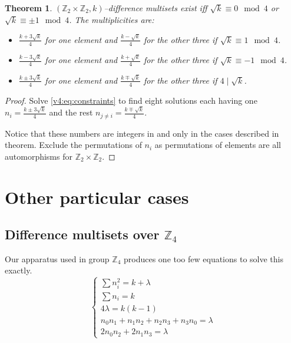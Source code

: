 \documentclass{article}
\theoremstyle{plain}
\newtheorem{theorem}{Theorem}[section]
\theoremstyle{definition}
\theoremstyle{remark}
\begin{document}
		\begin{theorem}
			\label{v4:theorem:z2z2}
			$(\mathbb Z_2 \times \mathbb Z_2, k)$--difference multisets exist iff $\sqrt k \equiv 0 \mod 4$ or $\sqrt k \equiv \pm 1 \mod 4$. The multiplicities are:
			\begin{itemize}
				\item $\frac{k + 3 \sqrt k}{4}$ for one element and $\frac{k - \sqrt k}{4}$ for the other three if $\sqrt k \equiv 1 \mod 4$.
				\item $\frac{k - 3 \sqrt k}{4}$ for one element and $\frac{k + \sqrt k}{4}$ for the other three if $\sqrt k \equiv -1 \mod 4$.
				\item $\frac{k \pm 3 \sqrt k}{4}$ for one element and $\frac{k \mp \sqrt k}{4}$ for the other three if $4 \mid \sqrt k$.
			\end{itemize}
		\end{theorem}
		
		\begin{proof}
			Solve \eqref{v4:eq:constraints} to find eight solutions each having one $n_i = \frac{k \pm 3 \sqrt k}{4}$ and the rest $n_{j \neq i} = \frac{k \mp \sqrt k}{4}$.
			
			Notice that these numbers are integers in and only in the cases described in theorem. Exclude the permutations of $n_i$ as permutations of elements are all automorphisms for $\mathbb Z_2 \times \mathbb Z_2$.
		\end{proof}
	
	\section{Other particular cases}
		\subsection{Difference multisets over $\mathbb Z_4$}
			Our apparatus used in group $\mathbb Z_4$ produces one too few equations to solve this exactly.
			\begin{equation}
				\label{other:z4:eq:constraints}
				\begin{cases}
					\sum n_i^2 = k + \lambda \\
					\sum n_i = k \\
					4 \lambda = k(k-1) \\
					n_0 n_1 + n_1 n_2 + n_2 n_3 + n_3 n_0 = \lambda \\
					2 n_0 n_2 + 2 n_1 n_3 = \lambda
				\end{cases}
			\end{equation}
			
\end{document}

